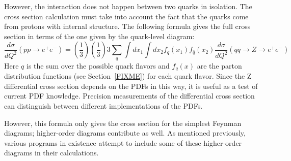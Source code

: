 

However, the interaction does not happen 
between two quarks in isolation.  
The cross section calculation must take 
into account the fact that the quarks come from 
protons with internal structure.  
The following formula gives the full cross section 
in terms of the one given by the quark-level diagram: 
\[
\frac{d \sigma}{d Q^2}(pp \rightarrow e^+ e^- )
= \left( \frac{1}{3} \right) \left( \frac{1}{3} \right) 3 
\sum_q \int dx_1 \int dx_2 f_q (x_1) f_{\bar{q}} (x_2)
\frac{d \sigma }{d Q^2}
( q \bar{q} \rightarrow Z \rightarrow e^+ e^- )
\]
Here $q$ is the sum over the possible quark flavors 
and $f_q(x)$ are the parton distribution functions 
(see Section~\ref{FIXME}) for each quark flavor.  
Since the Z differential cross section depends 
on the PDFs in this way, 
it is useful as a test of current PDF knowledge.  
Precision measurements of the differential cross section 
can distinguish between different implementations 
of the PDFs.  




However, this formula only gives the cross section 
for the simplest Feynman diagrams; 
higher-order diagrams contribute as well.  
As mentioned previously, various programs 
in existence attempt to include some of these higher-order 
diagrams in their calculations.  


